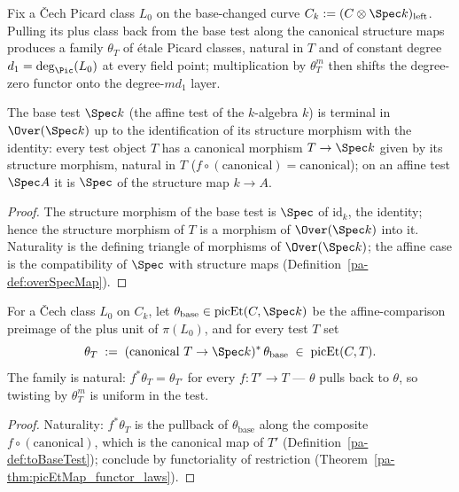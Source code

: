 Fix a \v Cech Picard class \(L_0\) on the base-changed curve
\(C_k := (C \otimes \Spec k)_{\mathrm{left}}\). Pulling its plus class back from the base
test along the canonical structure maps produces a family \(\theta_T\) of \'etale Picard
classes, natural in \(T\) and of constant degree \(d_1 = \deg_{\Pic}(L_0)\) at every field
point; multiplication by \(\theta_T^{m}\) then shifts the degree-zero functor onto the
degree-\(m d_1\) layer.

\begin{definition}
  \label{pa-def:toBaseTest}
  \leanok

  The base test \(\Spec k\) (the affine test of the \(k\)-algebra \(k\)) is terminal in
  \(\Over(\Spec k)\) up to the identification of its structure morphism with the identity:
  every test object \(T\) has a canonical morphism \(T \to \Spec k\) given by its structure
  morphism, natural in \(T\) (\(f \circ (\text{canonical}) = \text{canonical}\)); on an
  affine test \(\Spec A\) it is \(\Spec\) of the structure map \(k \to A\).
\end{definition}
\begin{proof}
  \leanok
  The structure morphism of the base test is \(\Spec\) of \(\mathrm{id}_k\), the identity;
  hence the structure morphism of \(T\) is a morphism of \(\Over(\Spec k)\) into it.
  Naturality is the defining triangle of morphisms of \(\Over(\Spec k)\); the affine case is
  the compatibility of \(\Spec\) with structure maps (Definition~\ref{pa-def:overSpecMap}).
\end{proof}

\begin{definition}
  \label{pa-def:thetaFamily}
  \leanok

  For a \v Cech class \(L_0\) on \(C_k\), let
  \(\theta_{\mathrm{base}} \in \mathrm{picEt}(C, \Spec k)\) be the affine-comparison preimage
  of the plus unit of \(\pi(L_0)\), and for every test \(T\) set
  \[
    \theta_T \;:=\; (\text{canonical } T \to \Spec k)^{*}\,\theta_{\mathrm{base}}
      \;\in\; \mathrm{picEt}(C,T).
  \]
  The family is natural: \(f^{*}\theta_T = \theta_{T'}\) for every \(f \colon T' \to T\) —
  \(\theta\) pulls back to \(\theta\), so twisting by \(\theta_T^{m}\) is uniform in the
  test.
\end{definition}
\begin{proof}
  \leanok
  Naturality: \(f^{*}\theta_T\) is the pullback of \(\theta_{\mathrm{base}}\) along the
  composite \(f \circ (\text{canonical})\), which is the canonical map of \(T'\)
  (Definition~\ref{pa-def:toBaseTest}); conclude by functoriality of restriction
  (Theorem~\ref{pa-thm:picEtMap_functor_laws}).
\end{proof}

